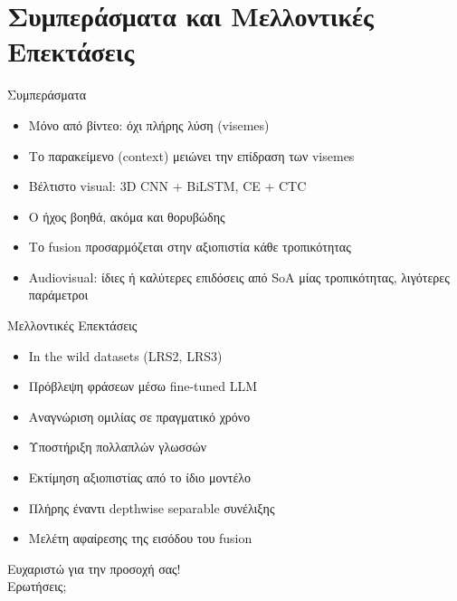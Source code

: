 \documentclass[aspectratio=169,10pt,xcolor=table]{beamer}
\begin{document}
\section{Συμπεράσματα και Μελλοντικές Επεκτάσεις}

\begin{frame}{Συμπεράσματα}
  \begin{itemize}
    \item Μόνο από βίντεο: όχι πλήρης λύση (visemes)
    \item Το παρακείμενο (context) μειώνει την επίδραση των visemes
    \item Βέλτιστο visual: 3D CNN + BiLSTM, CE + CTC
    \item Ο ήχος βοηθά, ακόμα και θορυβώδης
    \item Το fusion προσαρμόζεται στην αξιοπιστία κάθε τροπικότητας
    \item Audiovisual: ίδιες ή καλύτερες επιδόσεις από SoA μίας τροπικότητας, λιγότερες παράμετροι
  \end{itemize}
\end{frame}

\begin{frame}{Μελλοντικές Επεκτάσεις}
  \begin{itemize}
    \item In the wild datasets (LRS2, LRS3)
    \item Πρόβλεψη φράσεων μέσω fine-tuned LLM
    \item Αναγνώριση ομιλίας σε πραγματικό χρόνο
    \item Υποστήριξη πολλαπλών γλωσσών
    \item Εκτίμηση αξιοπιστίας από το ίδιο μοντέλο
    \item Πλήρης έναντι depthwise separable συνέλιξης
    \item Μελέτη αφαίρεσης της εισόδου του fusion
  \end{itemize}
\end{frame}

{
\begin{frame}[standout]
  Ευχαριστώ για την προσοχή σας!\\[6mm]
  {\normalsize Ερωτήσεις;}
\end{frame}}
\end{document}
